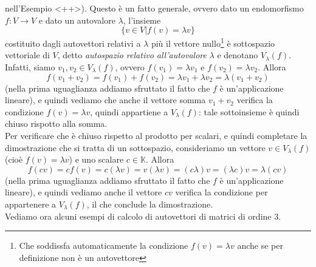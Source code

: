 \documentclass{book}
\begin{document}
nell'Esempio <++>). Questo è un fatto generale, ovvero dato un endomorfismo $f:V\to V$ e dato un autovalore
$\lambda$, l'insieme
\begin{equation*}
  \{v\in V| f(v)=\lambda v\}
\end{equation*}
costituito dagli autovettori relativi a $\lambda$ più il vettore nullo\footnote{Che soddissfa automaticamente
  la condizione $f(v)=\lambda v$ anche se per definizione non è un autovettore} è sottospazio vettoriale di $V$,
detto \textit{autospazio relativo all'autovalore} $\lambda$ e denotano $V_\lambda(f)$.\\
Infatti, siamo $v_1,v_2\in V_\lambda(f)$, ovvero $f(v_1)=\lambda v_1$ e $f(v_2)=\lambda v_2$. Allora
\begin{equation*}
  f(v_1+v_2)=f(v_1)+f(v_2)=\lambda v_1+\lambda v_2=\lambda(v_1+v_2)
\end{equation*}
(nella prima uguaglianza addiamo sfruttato il fatto che $f$ è un'applicazione lineare), e quindi vediamo che anche
il vettore somma $v_1+v_2$ verifica la condizione $f(v)=\lambda v$, quindi appartiene a $V_\lambda(f)$: tale
sottoinsieme è quindi chiuso rispotto alla somma.\\
Per verificare che è chiuso rispetto al prodotto per scalari, e quindi completare la dimostrazione che si tratta
di un sottospazio, consideriamo un vettore $v\in V_\lambda(f)$ (cioè $f(v)=\lambda v$) e uno scalare $c\in
\mathds{K}$. Allora
\begin{equation*}
  f(cv)=cf(v)=c(\lambda v)=v(\lambda v) =(c\lambda)v=(\lambda c)v=\lambda(cv)
\end{equation*}
(nella prima uguaglianza addiamo sfruttato il fatto che $f$ è un'applicazione lineare), e quindi vediamo anche il
vettore $cv$ verifica la condizione per appartenere a $V_\lambda (f)$, il che conclude la dimostrazione.\\
Vediamo ora alcuni esempi di calcolo di autovettori di matrici di ordine 3.
\end{document}
